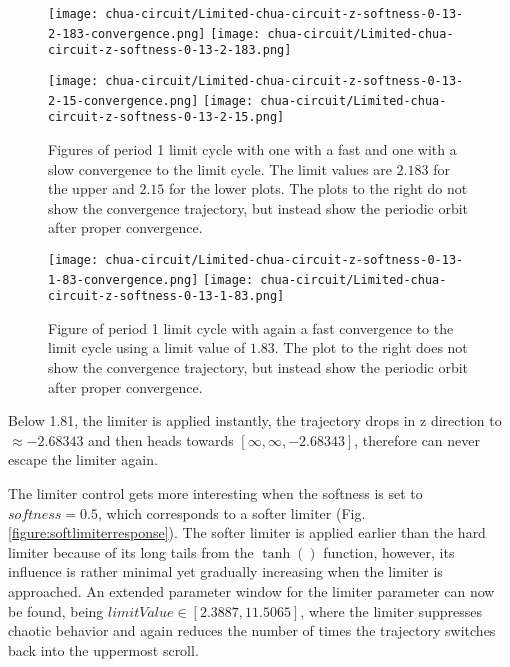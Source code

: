 \documentclass[main]{subfiles}
\begin{document}
\begin{figure}[H]
\centering
\texttt{[image: chua-circuit/Limited-chua-circuit-z-softness-0-13-2-183-convergence.png]}
\texttt{[image: chua-circuit/Limited-chua-circuit-z-softness-0-13-2-183.png]}

\texttt{[image: chua-circuit/Limited-chua-circuit-z-softness-0-13-2-15-convergence.png]}
\texttt{[image: chua-circuit/Limited-chua-circuit-z-softness-0-13-2-15.png]}
\caption[Figure of period 1 limit cycle]{Figures of period 1 limit cycle with one with a fast and one with a slow convergence to the limit cycle. The limit values are \(2.183\) for the upper and \(2.15\) for the lower plots. The plots to the right do not show the convergence trajectory, but instead show the periodic orbit after proper convergence.}
\label{figure:z-1-limit-cycle-ctrajectories}
\end{figure}

\begin{figure}[H]
\centering
\texttt{[image: chua-circuit/Limited-chua-circuit-z-softness-0-13-1-83-convergence.png]}
\texttt{[image: chua-circuit/Limited-chua-circuit-z-softness-0-13-1-83.png]}
\caption[Figure of another period 1 limit cycle]{Figure of period 1 limit cycle with again a fast convergence to the limit cycle using a limit value of \(1.83\). The plot to the right does not show the convergence trajectory, but instead show the periodic orbit after proper convergence.}
\label{figure:z-fast-1-limit-cycle-trajectory}
\end{figure}

Below 1.81, the limiter is applied instantly, the trajectory drops in z direction to \(\approx-2.68343\) and then heads towards \([\infty,\infty,-2.68343]\), therefore can never escape the limiter again.


The limiter control gets more interesting when the softness is set to \(softness=0.5\), which corresponds to a softer limiter (Fig. \ref{figure:softlimiterresponse}). %
%
The softer limiter is applied earlier than the hard limiter because of its long tails from the \(\tanh()\) function, however, its influence is rather minimal yet gradually increasing when the limiter is approached. %
%
An extended parameter window for the limiter parameter can now be found, being \(limitValue \in [2.3887,11.5065]\), where the limiter suppresses chaotic behavior and again reduces the number of times the trajectory switches back into the uppermost scroll.
\end{document}
